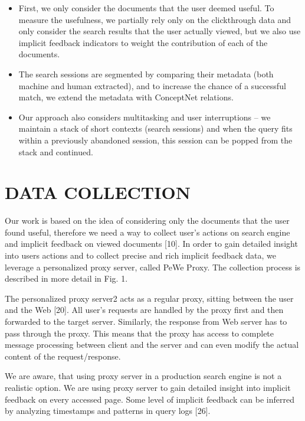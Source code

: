 \documentclass{acm_proc_article-sp} %
\begin{document}
\begin{itemize} 
	\item First, we only consider the documents that the user
	deemed useful. To measure the usefulness, we partially
	rely only on the clickthrough data and only consider
	the search results that the user actually viewed, but
	we also use implicit feedback indicators to weight the
	contribution of each of the documents.
	\item The search sessions are segmented by comparing their
	metadata (both machine and human extracted), and
	to increase the chance of a successful match, we extend
	the metadata with ConceptNet relations.
	\item Our approach also considers multitasking and user interruptions
	– we maintain a stack of short contexts
	(search sessions) and when the query fits within a previously
	abandoned session, this session can be popped
	from the stack and continued.
\end{itemize}

\section{DATA COLLECTION}

Our work is based on the idea of considering only the documents
that the user found useful, therefore we need a way
to collect user’s actions on search engine and implicit feedback
on viewed documents [10]. In order to gain detailed
insight into users actions and to collect precise and rich implicit
feedback data, we leverage a personalized proxy server,
called PeWe Proxy. The collection process is described in
more detail in Fig. 1.

The personalized proxy server2
acts as a regular proxy, sitting
between the user and the Web [20]. All user’s requests
are handled by the proxy first and then forwarded to the
target server. Similarly, the response from Web server has
to pass through the proxy. This means that the proxy has
access to complete message processing between client and
the server and can even modify the actual content of the
request/response.

We are aware, that using proxy server in a production search
engine is not a realistic option. We are using proxy server to
gain detailed insight into implicit feedback on every accessed
page. Some level of implicit feedback can be inferred by
analyzing timestamps and patterns in query logs [26].





\balancecolumns
\end{document}
